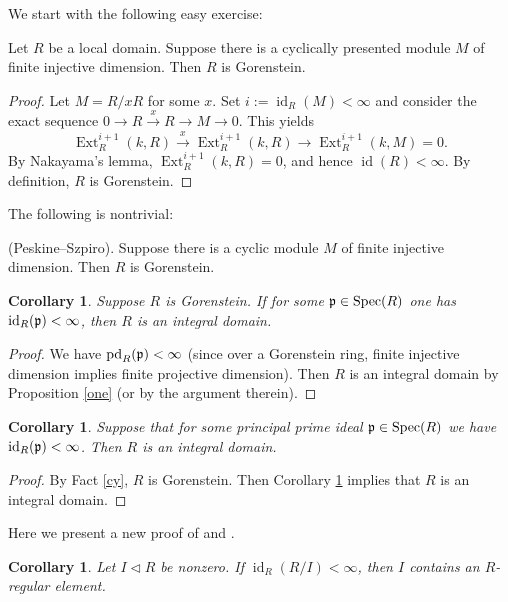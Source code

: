 \documentclass[10. pt,a4paper]{amsart}
\newtheorem{corollary}[theorem]{Corollary}
\theoremstyle{definition}
\theoremstyle{remark}
\newcommand{\Spec}{\operatorname{Spec}}
\newcommand{\id}{\operatorname{id}}
\newcommand{\pd}{\operatorname{pd}}
\newcommand{\Ext}{\operatorname{Ext}}
\newcommand{\fp}{\frak{p}}
\begin{document}
We start with the following easy exercise:

\begin{fact}
	Let $R$ be a local domain. Suppose there is a cyclically presented module $M$ of finite injective dimension. Then $R$ is Gorenstein.
\end{fact}

\begin{proof}
	Let $M = R/xR$ for some $x$. Set $i := \id_R(M) < \infty$ and consider the exact sequence $0 \to R \xrightarrow{x} R \to M \to 0$. This yields
	\[
	\Ext_R^{i+1}(k,R) \xrightarrow{x} \Ext_R^{i+1}(k,R) \longrightarrow \Ext_R^{i+1}(k,M) = 0.
	\]
	By Nakayama's lemma, $\Ext_R^{i+1}(k,R) = 0$, and hence $\id(R) < \infty$. By definition, $R$ is Gorenstein.
\end{proof}

The following is nontrivial:

\begin{fact}(Peskine--Szpiro).\label{cy}
	Suppose there is a cyclic module $M$ of finite injective dimension. Then $R$ is Gorenstein.
\end{fact}

\begin{corollary}\label{gd}
	Suppose $R$ is Gorenstein. If for some $\fp\in\Spec(R)$ one has $\id_R(\fp)<\infty$, then $R$ is an integral domain.
\end{corollary}

\begin{proof}
	We have $\pd_R(\fp)<\infty$ (since over a Gorenstein ring, finite injective dimension implies finite projective dimension). Then $R$ is an integral domain by Proposition \ref{one} (or by the argument therein).
\end{proof}

\begin{corollary}
	Suppose that for some principal prime ideal $\fp\in\Spec(R)$ we have $\id_R(\fp)<\infty$. Then $R$ is an integral domain.
\end{corollary}

\begin{proof}
	By Fact \ref{cy}, $R$ is Gorenstein. Then Corollary \ref{gd} implies that $R$ is an integral domain.
\end{proof}

Here we present a new proof of \cite[Theorem 5.2]{v1} and \cite[Theorem 2.11(iv)]{sha}.

\begin{corollary}
	Let $I \lhd R$ be nonzero. If $\id_R(R/I) < \infty$, then $I$ contains an $R$-regular element.
\end{corollary}
\end{document}
